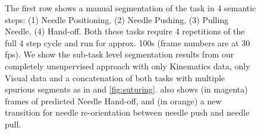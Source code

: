 \documentclass[0-main.tex]{subfiles}
\begin{document}
\begin{figure}[t!]
\begin{subfigure}[t]{2.65in}
	\end{subfigure}
	\caption{The first row shows a manual segmentation of the task in 4 semantic steps: (1) Needle Positioning, (2) Needle Pushing, (3) Pulling Needle, (4) Hand-off.
Both these tasks require 4 repetitions of the full 4 step cycle and run for approx. 100s (frame numbers are at 30 fps).
We show the sub-task level segmentation results from our completely unsupervised approach with only Kinematics data, only Visual data and a concatenation of both tasks with multiple spurious segments as in  and \ref{fig:suturing}.  also shows (in magenta) frames of predicted Needle Hand-off, and (in orange) a new transition for needle re-orientation between needle push and needle pull.
}
	\label{fig:jigsaws}
	\vspace{-15pt}
\end{figure}




\end{document}
